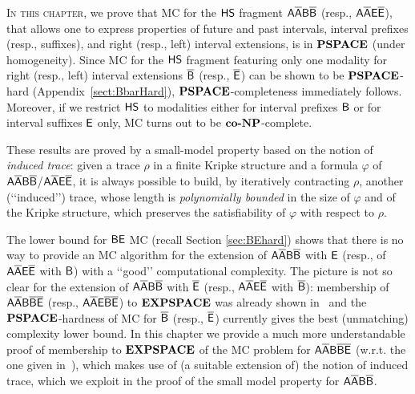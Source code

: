 \lettrine[lines=3]{I}{n this chapter,} we prove that MC for the $\text{\sffamily HS}$ fragment $\mathsf{A\overline{A}B\overline{B}}$ (resp., $\mathsf{A\overline{A}E\overline{E}}$), that allows one to express properties of future and past intervals, interval prefixes (resp., suffixes), and right (resp., left) interval extensions,
is in $\textbf{PSPACE}$ (under homogeneity).
Since MC for the $\text{\sffamily HS}$ fragment featuring only one modality for right (resp., left) interval extensions $\mathsf{\overline{B}}$ (resp., $\mathsf{\overline{E}}$) can be shown to be $\textbf{PSPACE}$-hard (Appendix~\ref{sect:BbarHard}), $\textbf{PSPACE}$-completeness immediately follows. 
Moreover, if we restrict $\text{\sffamily HS}$ to modalities either for interval prefixes $\mathsf{B}$ or for interval suffixes $\mathsf{E}$ only, MC turns out to be $\textbf{co-}\textbf{NP}$-complete.

These results are proved by a small-model property based on the notion of \emph{induced trace}: given a trace $\rho$ in a finite Kripke structure and a formula $\varphi$ of $\mathsf{A\overline{A}B\overline{B}}$/$\mathsf{A\overline{A}E\overline{E}}$, it is always possible to build, by iteratively contracting $\rho$, another (\lq\lq induced\rq\rq ) trace, 
whose length is \emph{polynomially bounded} in the size of $\varphi$ and of the Kripke structure, which preserves the satisfiability of  $\varphi$  with respect to  $\rho$.
%

The lower bound for $\mathsf{BE}$ MC (recall Section \ref{sec:BEhard}) shows that there is no way to provide an MC algorithm for the extension of $\mathsf{A\overline{A}B\overline{B}}$ with $\mathsf{E}$ (resp., of $\mathsf{A\overline{A}E\overline{E}}$ with $\mathsf{B}$)  with a \lq\lq good\rq\rq{} computational complexity. 
%
The picture is not so clear for the extension of $\mathsf{A\overline{A}B\overline{B}}$ with $\mathsf{\overline{E}}$ (resp., $\mathsf{A\overline{A}E\overline{E}}$ with $\mathsf{\overline{B}}$):
membership of $\mathsf{A\overline{A}B\overline{B}\overline{E}}$ (resp., $\mathsf{A\overline{A}E\overline{B}\overline{E}}$) to $\textbf{EXPSPACE}$  was already shown in~\cite{MMP15} and the $\textbf{PSPACE}$-hardness of MC for $\mathsf{\overline{B}}$ (resp., $\mathsf{\overline{E}}$) currently gives the best (unmatching) complexity lower bound.
In this chapter we provide a much more understandable proof of membership to $\textbf{EXPSPACE}$ of the MC problem for $\mathsf{A\overline{A}B\overline{B}\overline{E}}$ (w.r.t. the one given in~\cite{MMP15}), which makes use of (a suitable extension of) the notion of induced trace, which we exploit in the proof of the small model property for $\mathsf{A\overline{A}B\overline{B}}$.

